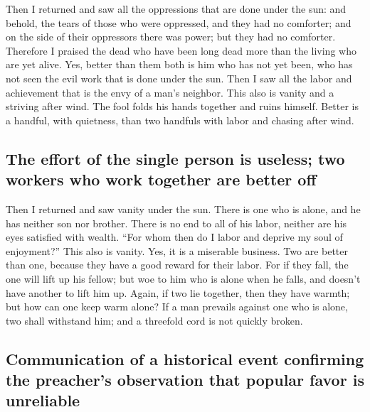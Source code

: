  Then I returned and saw all the oppressions that are done
under the sun: and behold, the tears of those who were oppressed, and
they had no comforter; and on the side of their oppressors there was
power; but they had no comforter.  Therefore I praised the
dead who have been long dead more than the living who are yet alive.
 Yes, better than them both is him who has not yet been,
who has not seen the evil work that is done under the sun.
 Then I saw all the labor and achievement that is the envy
of a man's neighbor. This also is vanity and a striving after wind.
 The fool folds his hands together and ruins himself.
 Better is a handful, with quietness, than two handfuls
with labor and chasing after wind.

\hypertarget{the-effort-of-the-single-person-is-useless-two-workers-who-work-together-are-better-off}{%
\subsection{The effort of the single person is useless; two workers who
work together are better
off}\label{the-effort-of-the-single-person-is-useless-two-workers-who-work-together-are-better-off}}

 Then I returned and saw vanity under the sun.
 There is one who is alone, and he has neither son nor
brother. There is no end to all of his labor, neither are his eyes
satisfied with wealth. ``For whom then do I labor and deprive my soul of
enjoyment?'' This also is vanity. Yes, it is a miserable business.
 Two are better than one, because they have a good reward
for their labor.  For if they fall, the one will lift up
his fellow; but woe to him who is alone when he falls, and doesn't have
another to lift him up.  Again, if two lie together, then
they have warmth; but how can one keep warm alone?  If a
man prevails against one who is alone, two shall withstand him; and a
threefold cord is not quickly broken.

\hypertarget{communication-of-a-historical-event-confirming-the-preachers-observation-that-popular-favor-is-unreliable}{%
\subsection{Communication of a historical event confirming the
preacher's observation that popular favor is
unreliable}\label{communication-of-a-historical-event-confirming-the-preachers-observation-that-popular-favor-is-unreliable}}

